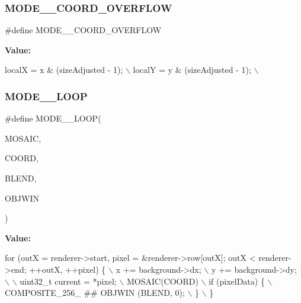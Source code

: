 \subsubsection{\texorpdfstring{M\+O\+D\+E\+\_\+\_\+\+C\+O\+O\+R\+D\+\_\+\+O\+V\+E\+R\+F\+L\+OW}{MODE\_2\_COORD\_OVERFLOW}}
{\footnotesize\ttfamily \#define M\+O\+D\+E\+\_\+\_\+\+C\+O\+O\+R\+D\+\_\+\+O\+V\+E\+R\+F\+L\+OW}

{\bfseries Value\+:}
\begin{DoxyCode}
localX = x & (sizeAdjusted - 1); \(\backslash\)
    localY = y & (sizeAdjusted - 1); \(\backslash\)
\end{DoxyCode}
\mbox{\label{software-bg_8c_a86cd3da091252309dee9b6499831ba25}} 
\subsubsection{\texorpdfstring{M\+O\+D\+E\+\_\+\_\+\+L\+O\+OP}{MODE\_2\_LOOP}}
{\footnotesize\ttfamily \#define M\+O\+D\+E\+\_\+\_\+\+L\+O\+OP(\begin{DoxyParamCaption}\item[{}]{M\+O\+S\+A\+IC,  }\item[{}]{C\+O\+O\+RD,  }\item[{}]{B\+L\+E\+ND,  }\item[{}]{O\+B\+J\+W\+IN }\end{DoxyParamCaption})}

{\bfseries Value\+:}
\begin{DoxyCode}
\textcolor{keywordflow}{for} (outX = renderer->start, pixel = &renderer->row[outX]; outX < renderer->end; ++outX, ++pixel) \{ \(\backslash\)
        x += background->dx; \(\backslash\)
        y += background->dy; \(\backslash\)
        \(\backslash\)
        uint32\_t current = *pixel; \(\backslash\)
        MOSAIC(COORD) \(\backslash\)
        if (pixelData) \{ \(\backslash\)
            COMPOSITE\_256\_ ## OBJWIN (BLEND, 0); \(\backslash\)
        \} \(\backslash\)
    \}
\end{DoxyCode}
\mbox{\label{software-bg_8c_af363f69e67cd850494fefb9983f83cfd}} 
